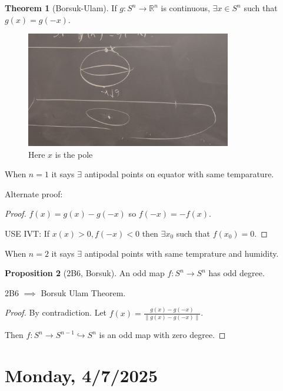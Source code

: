 \documentclass{article}
\theoremstyle{definition}
\newtheorem{theorem}{Theorem}
\newtheorem{proposition}[theorem]{Proposition}
\begin{document}
    \begin{theorem}
        [Borsuk-Ulam] If \(g: S^n \to \mathbb{R}^n\) is continuous, \(\exists x\in S^n\) such that \(g(x) = g(-x)\).
    \end{theorem}

    \begin{figure}[H]
        \centering
        \includegraphics[width=0.8\textwidth]{img/borsukulamexample}
        \caption{Here \(x\) is the pole}
    \end{figure}    

    When \(n=1\) it says \(\exists\) antipodal points on equator with same temparature.

    Alternate proof:

    \begin{proof}
        \(f(x) = g(x) - g(-x)\) so \(f(-x) = -f(x)\).

        USE IVT: If \(x(x) > 0, f(-x) < 0\) then \(\exists x_0\) such that \(f(x_0) = 0\).
    \end{proof}

    When \(n=2\) it says \(\exists\) antipodal points with same temprature and humidity.

    \begin{proposition}
        [2B6, Borsuk] An odd map \(f: S^n \to S^n\) has odd degree.
    \end{proposition}

    2B6 \(\implies\) Borsuk Ulam Theorem.

    \begin{proof}
        By contradiction. Let \(f(x) = \frac{g(x) - g(-x)}{\lVert g(x) - g(-x) \rVert}\).
        
        Then \(f: S^n \to S^{n-1} \hookrightarrow S^n\) is an odd map with zero degree. 
    \end{proof}

    \section*{Monday, 4/7/2025}
    
\end{document}
